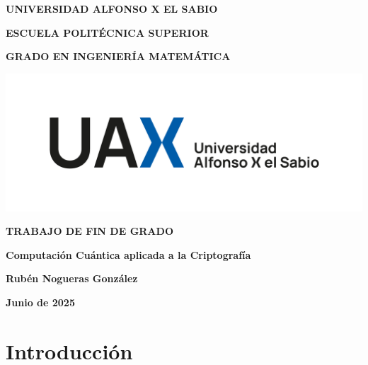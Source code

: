\documentclass{article}
\begin{document}
    \begin{titlepage}
        \centering
        {\fontsize{18pt}{22pt}\selectfont \textbf{UNIVERSIDAD ALFONSO X EL SABIO}\par}
        \vspace{1cm}
        {\fontsize{16pt}{22pt}\selectfont \textbf{ESCUELA POLITÉCNICA SUPERIOR}\par}
        \vspace{1cm}
        {\fontsize{14pt}{22pt}\selectfont \textbf{GRADO EN INGENIERÍA MATEMÁTICA}\par}
        \vspace{2cm}
        {\includegraphics[width=1\textwidth]{img/portada.png}\par}
        \vspace{0.5cm}
        {\fontsize{20pt}{22pt}\selectfont \textbf{TRABAJO DE FIN DE GRADO}\par}
        \vspace{1cm}
        {\fontsize{14pt}{22pt}\selectfont \textbf{Computación Cuántica aplicada a la Criptografía}\par}
        \vfill
        {\fontsize{14pt}{22pt}\selectfont \textbf{Rubén Nogueras González}\par}
        \vspace{1cm}
        {\fontsize{14pt}{22pt}\selectfont \textbf{Junio de 2025}\par}
    \end{titlepage}
    
    \newpage
    \thispagestyle{empty}
    \mbox{}
    \newpage

    \tableofcontents

    \newpage
    \thispagestyle{empty}
    \mbox{}
    \newpage

    \listoffigures

    \newpage
    \thispagestyle{empty}
    \mbox{}
    \newpage
    
    \section{Introducción}
\end{document}
